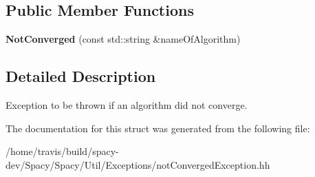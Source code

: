 \subsection*{Public Member Functions}
\begin{DoxyCompactItemize}
\item 
\hypertarget{structSpacy_1_1Exception_1_1NotConverged_ad8da434f7ab60570e598b4e3a659072d}{{\bfseries Not\-Converged} (const std\-::string \&name\-Of\-Algorithm)}\label{structSpacy_1_1Exception_1_1NotConverged_ad8da434f7ab60570e598b4e3a659072d}

\end{DoxyCompactItemize}


\subsection{Detailed Description}
Exception to be thrown if an algorithm did not converge. 

The documentation for this struct was generated from the following file\-:\begin{DoxyCompactItemize}
\item 
/home/travis/build/spacy-\/dev/\-Spacy/\-Spacy/\-Util/\-Exceptions/not\-Converged\-Exception.\-hh\end{DoxyCompactItemize}
